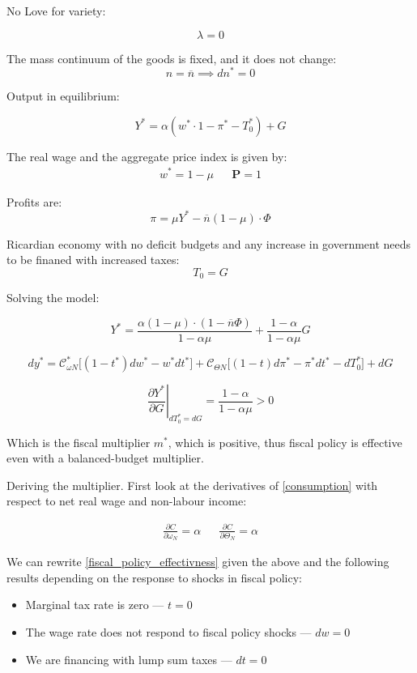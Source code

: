 No Love for variety: 

$$
\lambda = 0
$$


The mass continuum of the goods is fixed, and it does not change:
$$
n = \overline{n} \implies dn^* = 0
$$

Output in equilibrium:

$$
Y^* = \alpha \left( w^* \cdot 1 - \pi^* - T^*_0 \right) + G
$$

The real wage and the aggregate price index is given by:
\begin{align*}
    w^* = 1 - \mu
    &&
    \mathbf{P} = 1
\end{align*}


Profits are:
$$
\pi = \mu Y^* - \overline{n}(1-\mu) \cdot \Phi
$$

Ricardian economy with no deficit budgets and any increase in government needs to be finaned with increased taxes:
$$
T_0 = G
$$


Solving the model:

\begin{equation*}
    Y^* = \frac{\alpha (1- \mu) \cdot (1- \overline{n} \Phi)}{1 - \alpha \mu} + \frac{1 - \alpha}{1 - \alpha \mu}G
\end{equation*}

\begin{equation*}
    dy^*=\mathcal{C}_{\omega N}^* \bigg[(1-t^*)dw^* - w^*dt^* \bigg] + \mathcal{C}_{\Theta N} \bigg[ (1-t)d\pi^*-\pi^*dt^*-dT_{0}^*\bigg] + dG      
\end{equation*}

$$
 \left. \frac{\partial Y^*}{\partial G} \right\rvert_{dT^*_0 = dG} = \frac{1 - \alpha}{1 - \alpha \mu} > 0
 $$
 
 Which is the fiscal multiplier $m^*$, which is positive, thus fiscal policy is effective even with a balanced-budget multiplier. 
 

Deriving the multiplier. First look at the derivatives of \ref{consumption} with respect to net real wage and non-labour income:

\begin{align*}
    \frac{\partial C}{\partial \omega_N} = \alpha && \frac{\partial C}{\partial \Theta_N} = \alpha
\end{align*}

We can rewrite \ref{fiscal_policy_effectivness} given the above and the following results depending on the response to shocks in fiscal policy:

\begin{itemize}
    \item Marginal tax rate is zero --- $t = 0$
    \item The wage rate does not respond to fiscal policy shocks --- $dw = 0$
    \item We are financing with lump sum taxes --- $dt = 0$
\end{itemize}

